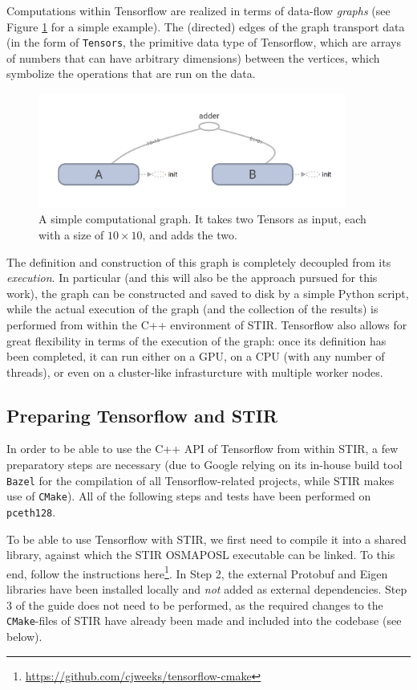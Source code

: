 \documentclass[a4paper, 11pt]{article}
\begin{document}
  Computations within Tensorflow are realized in terms of data-flow \textsl{graphs} (see Figure \ref{example-graph} for a simple example). The (directed) edges of the graph transport data (in the form of \texttt{Tensors}, the primitive data type of Tensorflow, which are arrays of numbers that can have arbitrary dimensions) between the vertices, which symbolize the operations that are run on the data. 
  \begin{figure}
    \centering
    \includegraphics[width = 0.9\textwidth]{../ExampleGraph.png}
    \caption{A simple computational graph. It takes two Tensors as input, each with a size of $10 \times 10$, and adds the two.}
    \label{example-graph}
  \end{figure}

  The definition and construction of this graph is completely decoupled from its \textsl{execution}. In particular (and this will also be the approach pursued for this work), the graph can be constructed and saved to disk by a simple Python script, while the actual execution of the graph (and the collection of the results) is performed from within the C++ environment of STIR. Tensorflow also allows for great flexibility in terms of the execution of the graph: once its definition has been completed, it can run either on a GPU, on a CPU (with any number of threads), or even on a cluster-like infrasturcture with multiple worker nodes.
  
  \subsection{Preparing Tensorflow and STIR}
  In order to be able to use the C++ API of Tensorflow from within STIR, a few preparatory steps are necessary (due to Google relying on its in-house build tool \texttt{Bazel} for the compilation of all Tensorflow-related projects, while STIR makes use of \texttt{CMake}). All of the following steps and tests have been performed on \texttt{pceth128}. 

  To be able to use Tensorflow with STIR, we first need to compile it into a shared library, against which the STIR OSMAPOSL executable can be linked. To this end, follow the instructions here\footnote{\url{https://github.com/cjweeks/tensorflow-cmake}}. In Step 2, the external Protobuf and Eigen libraries have been installed locally and \textsl{not} added as external dependencies. Step 3 of the guide does not need to be performed, as the required changes to the \texttt{CMake}-files of STIR have already been made and included into the codebase (see below).
\end{document}
